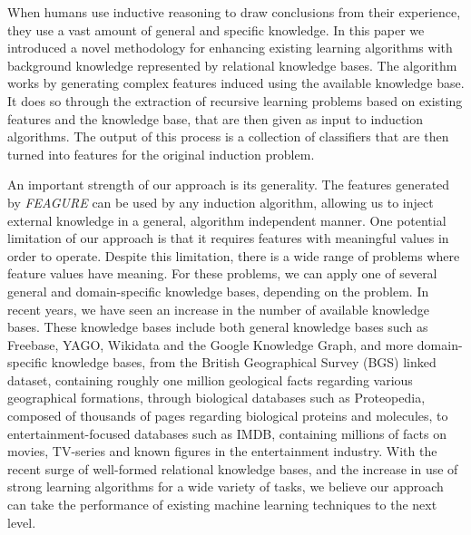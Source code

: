 \documentclass[letterpaper]{article} %
\theoremstyle{definition}
\begin{document}
When humans use inductive reasoning to draw conclusions from their experience, they use a vast amount of general and specific knowledge. In this paper we introduced a novel methodology for enhancing existing learning algorithms with background knowledge represented by relational knowledge bases.
The algorithm works by generating complex features induced using the available knowledge base. It does so through the extraction of recursive learning problems based on existing features and the knowledge base, that are then given as input to induction algorithms. The output of this process is a collection of classifiers that are then turned into features for the original induction problem.

An important strength of our approach is its generality. The features generated by \emph{FEAGURE}
can be used by any induction algorithm, allowing us to inject external knowledge in a general,
algorithm independent manner. One potential limitation of our approach is that it requires features
with meaningful values in order to operate. Despite this limitation, there is a wide range of problems
where feature values have meaning. For these problems, we can apply one of several general and
domain-specific knowledge bases, depending on the problem.
In recent years, we have seen an increase in the number of available knowledge bases. These
knowledge bases include both general knowledge bases such as Freebase, YAGO, Wikidata and the
Google Knowledge Graph, and more domain-specific knowledge bases, from the British Geographical
Survey (BGS) linked dataset, containing roughly one million geological facts regarding various
geographical formations, through biological databases such as Proteopedia, composed of thousands
of pages regarding biological proteins and molecules, to entertainment-focused databases such as
IMDB, containing millions of facts on movies, TV-series and known figures in the entertainment
industry. With the recent surge of well-formed relational knowledge bases, and the increase in use
of strong learning algorithms for a wide variety of tasks, we believe our approach can take the
performance of existing machine learning techniques to the next level.

\clearpage


\end{document}
